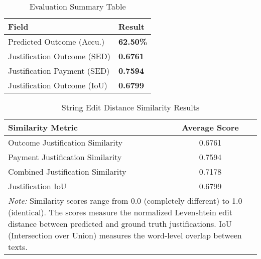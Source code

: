 
\begin{table}[H]
\centering
\caption{Evaluation Summary Table}
\label{tab:evaluation_summary}
\begin{tabular}{@{}lp{2cm}@{}}
\toprule
\textbf{Field} & \textbf{Result} \\
\midrule
Predicted Outcome (Accu.) & \textbf{62.50\%} \\
Justification Outcome (SED) &  \textbf{0.6761} \\
Justification Payment (SED) &  \textbf{0.7594} \\
Justification Outcome (IoU) &  \textbf{0.6799} \\
\bottomrule
\end{tabular}
\end{table}

\begin{table}[!ht]
\centering
\caption{String Edit Distance Similarity Results}
\label{tab:string_edit_distance_results}
\begin{tabular}{lc}
\toprule
\textbf{Similarity Metric} & \textbf{Average Score} \\
\midrule
Outcome Justification Similarity & 0.6761 \\
Payment Justification Similarity & 0.7594 \\
Combined Justification Similarity & 0.7178 \\
Justification IoU & 0.6799 \\
\midrule
\multicolumn{2}{p{13cm}}{\textit{Note:} Similarity scores range from 0.0 (completely different) to 1.0 (identical). 
The scores measure the normalized Levenshtein edit distance between predicted and ground truth justifications.
IoU (Intersection over Union) measures the word-level overlap between texts.} \\
\bottomrule
\end{tabular}
\end{table}

